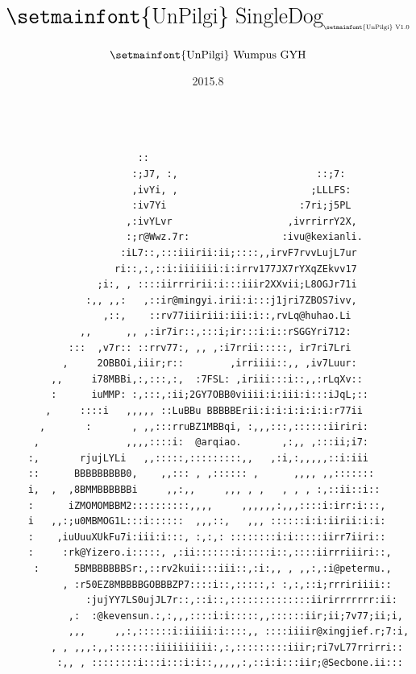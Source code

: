\documentclass{article}
\title{$\text{\Huge{{\setmainfont{UnPilgi} SingleDog}}}_{\text{\setmainfont{UnPilgi} V1.0}}$}
\author{$\text{\setmainfont{UnPilgi} Wumpus GYH}$}
\date{2015.8}
\begin{document}


\begin{titlepage}

\maketitle
\setcounter{page}{0}
\thispagestyle{empty}

\begin{verbatim}

                       ::
                      :;J7, :,                        ::;7:
                      ,ivYi, ,                       ;LLLFS:
                      :iv7Yi                       :7ri;j5PL
                     ,:ivYLvr                    ,ivrrirrY2X,
                     :;r@Wwz.7r:                :ivu@kexianli.
                    :iL7::,:::iiirii:ii;::::,,irvF7rvvLujL7ur
                   ri::,:,::i:iiiiiii:i:irrv177JX7rYXqZEkvv17
                ;i:, , ::::iirrririi:i:::iiir2XXvii;L8OGJr71i
              :,, ,,:   ,::ir@mingyi.irii:i:::j1jri7ZBOS7ivv,
                 ,::,    ::rv77iiiriii:iii:i::,rvLq@huhao.Li
             ,,      ,, ,:ir7ir::,:::i;ir:::i:i::rSGGYri712:
           :::  ,v7r:: ::rrv77:, ,, ,:i7rrii:::::, ir7ri7Lri
          ,     2OBBOi,iiir;r::        ,irriiii::,, ,iv7Luur:
        ,,     i78MBBi,:,:::,:,  :7FSL: ,iriii:::i::,,:rLqXv::
        :      iuMMP: :,:::,:ii;2GY7OBB0viiii:i:iii:i:::iJqL;::
       ,     ::::i   ,,,,, ::LuBBu BBBBBErii:i:i:i:i:i:i:r77ii
      ,       :       , ,,:::rruBZ1MBBqi, :,,,:::,::::::iiriri:
     ,               ,,,,::::i:  @arqiao.       ,:,, ,:::ii;i7:
    :,       rjujLYLi   ,,:::::,:::::::::,,   ,:i,:,,,,,::i:iii
    ::      BBBBBBBBB0,    ,,::: , ,:::::: ,      ,,,, ,,:::::::
    i,  ,  ,8BMMBBBBBBi     ,,:,,     ,,, , ,   , , , :,::ii::i::
    :      iZMOMOMBBM2::::::::::,,,,     ,,,,,,:,,,::::i:irr:i:::,
    i   ,,:;u0MBMOG1L:::i::::::  ,,,::,   ,,, ::::::i:i:iirii:i:i:
    :    ,iuUuuXUkFu7i:iii:i:::, :,:,: ::::::::i:i:::::iirr7iiri::
    :     :rk@Yizero.i:::::, ,:ii:::::::i:::::i::,::::iirrriiiri::,
     :      5BMBBBBBBSr:,::rv2kuii:::iii::,:i:,, , ,,:,:i@petermu.,
          , :r50EZ8MBBBBGOBBBZP7::::i::,:::::,: :,:,::i;rrririiii::
              :jujYY7LS0ujJL7r::,::i::,::::::::::::::iirirrrrrrr:ii:
           ,:  :@kevensun.:,:,,,::::i:i:::::,,::::::iir;ii;7v77;ii;i,
           ,,,     ,,:,::::::i:iiiii:i::::,, ::::iiiir@xingjief.r;7:i,
        , , ,,,:,,::::::::iiiiiiiiii:,:,:::::::::iiir;ri7vL77rrirri::
         :,, , ::::::::i:::i:::i:i::,,,,,:,::i:i:::iir;@Secbone.ii:::
\end{verbatim}
\end{titlepage}
\newpage
\end{document}
